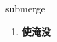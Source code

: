 
\begin{frame}
{\huge submerge}
\begin{center}
\begin{enumerate}\Large
  \item \textbf{使淹没}
\end{enumerate}
\end{center}
\end{frame}
